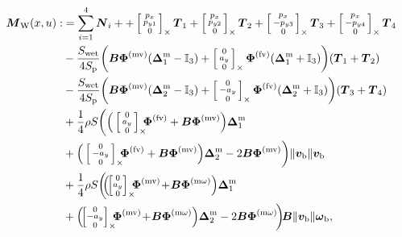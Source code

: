     \begin{align} 
    \nonumber
    \boldsymbol{M}_{\text{W}}(x,u) :&= \sum_{i=1}^{4} \boldsymbol{N}_{i} ++\skewsym{\smallm{p_x\\ p_{y1}\\ 0}} \boldsymbol{T}_{1} +\skewsym{\smallm{p_x\\ p_{y2}\\ 0}} \boldsymbol{T}_{2} + \skewsym{\smallm{p_x\\ - p_{y3}\\ 0}} \boldsymbol{T}_{3} + \skewsym{\smallm{p_x\\ - p_{y4}\\ 0}} \boldsymbol{T}_{4}\\
        \nonumber
    &- \frac{S_{\text{wet}}}{4S_{\text{p}}} \bigg( \boldsymbol{B} \boldsymbol{\Phi}^{\text{(mv)}} (\boldsymbol{\Delta}^{\text{m}}_1- \mathbb{I}_{3} ) + \skewsym{\smallm{0 \\ a_y \\ 0}} \boldsymbol{\Phi}^{\text{(fv)}} (\boldsymbol{\Delta}^{\text{m}}_1 +\mathbb{I}_{3} ) \bigg) (\boldsymbol{T}_{1}+\boldsymbol{T}_{2}) \\
        \nonumber
    & - \frac{S_{\text{wet}}}{4S_{\text{p}}} \bigg( \boldsymbol{B} \boldsymbol{\Phi}^{\text{(mv)}} (\boldsymbol{\Delta}^{\text{m}}_2 - \mathbb{I}_{3} ) +  \skewsym{\smallm{0 \\ - a_y \\ 0}} \boldsymbol{\Phi}^{\text{(fv)}} (\boldsymbol{\Delta}^{\text{m}}_2 + \mathbb{I}_{3}) \bigg) (\boldsymbol{T}_{3}+\boldsymbol{T}_{4}) \\
        \nonumber
    & + \frac{1}{4} \rho S  \bigg( \Big(\skewsym{\smallm{0 \\ a_y \\ 0}} \!\!\! \boldsymbol{\Phi}^{\text{(fv)}}  + \boldsymbol{B} \boldsymbol{\Phi}^{\text{(mv)}} \Big) \boldsymbol{\Delta}^{\text{m}}_1 \\
        \nonumber
    &  + \Big( \skewsym{\smallm{0 \\ - a_y \\ 0}} \!\!\! \boldsymbol{\Phi}^{\text{(fv)}} + \boldsymbol{B} \boldsymbol{\Phi}^{\text{(mv)}}  \Big) \boldsymbol{\Delta}^{\text{m}}_2 - 2 \boldsymbol{B} \boldsymbol{\Phi}^{\text{(mv)}}  \bigg) \lVert \boldsymbol{v_{\text{b}}} \rVert \boldsymbol{v_{\text{b}}} \\
        \nonumber
    & +\frac{1}{4} \rho S \bigg(\!\! \Big(\!\! \skewsym{\!\smallm{0 \\ a_y \\ 0}\!}\!\!\! \boldsymbol{\Phi}^{\text{(mv)}} \! + \! \boldsymbol{B} \boldsymbol{\Phi}^{\text{(m$\omega$)}} \Big) \boldsymbol{\Delta}^{\text{m}}_1 \\
    & +  \Big(\!\! \skewsym{\!\smallm{0 \\ - a_y \\ 0}\!} \!\!\! \boldsymbol{\Phi}^{\text{(mv)}} \! + \! \boldsymbol{B} \boldsymbol{\Phi}^{\text{(m$\omega$)}}  \Big) \boldsymbol{\Delta}^{\text{m}}_2 - 2 \boldsymbol{B} \boldsymbol{\Phi}^{\text{(m$\omega$)}}\!  \bigg)\!  \boldsymbol{B}  \lVert \boldsymbol{v_{\text{b}}} \rVert  \boldsymbol{\omega}_{\text{b}} , \label{eq:MbColibri}
    \end{align}

